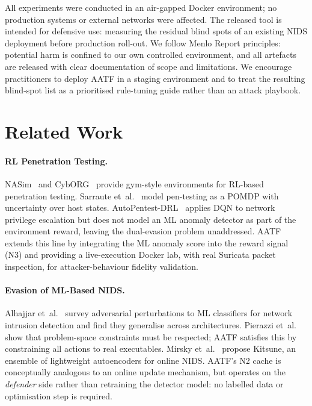 \documentclass[sigconf]{acmart}
\begin{document}
All experiments were conducted in an air-gapped Docker environment; no
production systems or external networks were affected. The released
tool is intended for defensive use: measuring the residual blind spots
of an existing NIDS deployment before production roll-out. We follow
Menlo Report principles: potential harm is confined to our own
controlled environment, and all artefacts are released with clear
documentation of scope and limitations. We encourage practitioners
to deploy AATF in a staging environment and to treat the resulting
blind-spot list as a prioritised rule-tuning guide rather than an
attack playbook.

\section{Related Work}
\label{sec:relwork}

\paragraph{RL Penetration Testing.}
NASim~\cite{schwartz2020nasim} and CybORG~\cite{standen2021cyborg}
provide gym-style environments for RL-based penetration testing.
Sarraute et~al.~\cite{sarraute2012pomdps} model pen-testing as a POMDP
with uncertainty over host states. AutoPentest-DRL~\cite{chaudhary2022autopentest}
applies DQN to network privilege escalation but does not model an ML
anomaly detector as part of the environment reward, leaving the
dual-evasion problem unaddressed. AATF extends this line by integrating
the ML anomaly score into the reward signal (N3) and providing a
live-execution Docker lab, with real Suricata packet inspection, for
attacker-behaviour fidelity validation.

\paragraph{Evasion of ML-Based NIDS.}
Alhajjar et~al.~\cite{alhajjar2021adversarial} survey adversarial
perturbations to ML classifiers for network intrusion detection and
find they generalise across architectures. Pierazzi
et~al.~\cite{pierazzi2020intriguing} show that problem-space constraints
must be respected; AATF satisfies this by constraining all actions to
real executables. Mirsky et~al.~\cite{mirsky2018kitsune} propose Kitsune,
an ensemble of lightweight autoencoders for online NIDS. AATF's N2 cache
is conceptually analogous to an online update mechanism, but operates on
the \emph{defender} side rather than retraining the detector model:
no labelled data or optimisation step is required.
\end{document}
